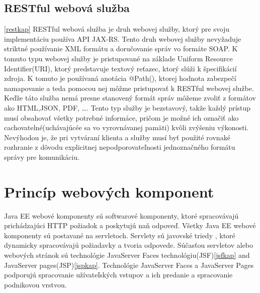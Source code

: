 \subsection{RESTful webová služba}\ref{restkap}
RESTful webová služba je druh webovej služby, ktorý pre svoju implementáciu používa API JAX-RS\cite{fitweb}. Tento druh webovej služby nevyžaduje striktné používanie XML formátu a doručovanie správ vo formáte SOAP. K tomuto typu webovej služby je pristupované na základe Uniform Resource Identifier(URI), ktorý predstavuje textový reťazec, ktorý slúži k špecifikácií zdroja. K tomuto je používaná anotácia @Path(), ktorej hodnota zabezpečí namapovanie a teda pomocou nej môžme pristupovať k RESTful webovej službe. Keďže táto služba nemá presne stanovený formát správ môžeme zvoliť z formátov ako HTML,JSON, PDF, \ldots. Tento typ služby je bezstavový, takže každý prístup musí obsahovať všetky potrebné informáce, pričom je možné ich označiť ako cachovatelné(uchávajúcée sa vo vyrovnávanej pamäti) kvôli zvýšeniu výkonosti. Nevýhodou je, že pri vytváraní klienta a služby musí byť použité rovnaké rozhranie z dôvodu explicitnej nepodporovateľnosti jednoznačného formátu správy pre komunikáciu.


\section{Princíp webových komponent}
Java EE webové komponenty sú softwarové komponenty, ktoré spracovávajú prichádzajúci HTTP požiadok a poskytujú naň odpoveď. Všetky Java EE webové komponenty sú postavané na servletoch. Servlety sú javovské triedy , ktoré dynamicky spracovávajú požiadavky a tvoria odpovede. Súčasťou servletov alebo webových stránok  sú technológie JavaServer Faces technológiu(JSF)\ref{jsfkap} and JavaServer pages(JSP)\ref{jspkap}. Technológie JavaServer Faces a JavaServer Pages podporujú spracovanie užívateľských vstupov a ich predanie a spracovanie podnikovou vrstvou.



